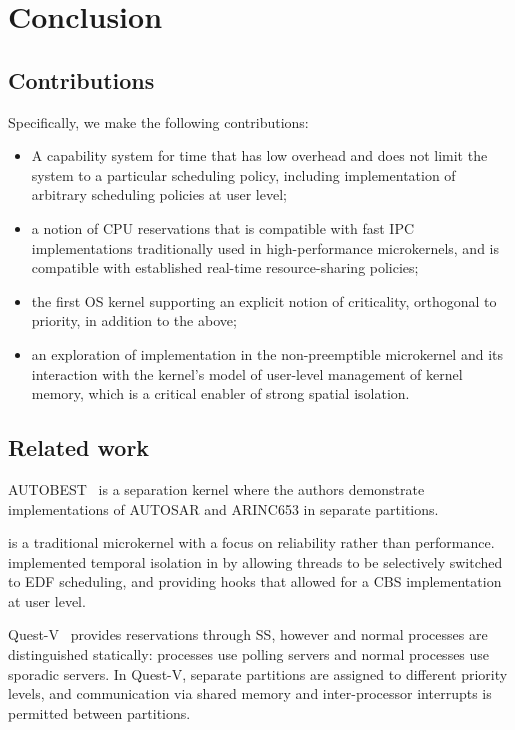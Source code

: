 \chapter{Conclusion}
\label{chap:conclusion}

\section{Contributions}

Specifically, we make the following contributions:
\begin{itemize}
\item A capability system for time that has low overhead and does not
  limit the system to a particular scheduling policy, including
  implementation of arbitrary scheduling policies at user level;
\item a notion of CPU reservations that is compatible with
  fast IPC implementations traditionally used in high-performance
  microkernels, and is compatible with established real-time resource-sharing policies;
\item the first OS kernel supporting an explicit notion of
  criticality, orthogonal to priority, in addition to the above;
\item an exploration of implementation in the non-preemptible \selfour
  microkernel and its interaction with the kernel's model of
  user-level management of kernel memory, which is a critical enabler
  of strong spatial isolation.
\end{itemize}

\section{Related work}


AUTOBEST~\citep{Zuepke_BL_15} is a separation kernel where the authors demonstrate implementations of
AUTOSAR and ARINC653 in separate partitions.

\minix is a traditional microkernel with a focus on 
     reliability rather than performance. \citet{Herder_BGHT_06} implemented temporal isolation in
     \minix by allowing threads to be selectively switched to \gls{EDF} scheduling, and providing
     hooks that allowed for a \gls{CBS} implementation at user level. %

    Quest-V~\citep{Danish_LW_11} provides reservations through \gls{SS}, however \IO and normal processes
are distinguished statically: \IO processes use polling servers and normal processes use sporadic
servers. In Quest-V, separate partitions are assigned to
different priority levels, and communication via shared memory and inter-processor interrupts 
is permitted between partitions.


